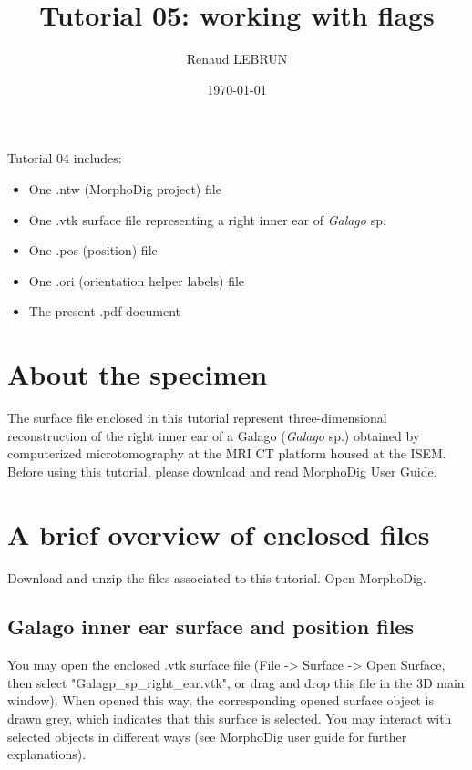 \documentclass[12pt, a4paper]{book}
\title{Tutorial 05: working with flags}
\author{Renaud LEBRUN}
\affil{Institut des Sciences de l'Evolution, Université de Montpellier, France}
\date{\today}
\begin{document}
	\dominitoc

\maketitle


\faketableofcontents



\minitoc 
Tutorial 04 includes:
\begin{itemize}
\item One .ntw (MorphoDig project) file
\item One .vtk surface file representing a right inner ear of \textit{Galago} sp.
\item One .pos (position) file 
\item One .ori (orientation helper labels) file 
\item The present .pdf document
\end{itemize}





\section{About the specimen}

The surface file enclosed in this tutorial represent three-dimensional reconstruction of the right inner ear of a Galago (\textit{Galago} sp.) obtained by computerized microtomography at the MRI \si{\micro} CT platform housed at the ISEM.\\
Before using this tutorial, please download and read MorphoDig User Guide.


\section{A brief overview of enclosed files}
		Download and unzip the files associated to this tutorial. Open MorphoDig.
\subsection{Galago inner ear surface and position files}
	You may open the enclosed .vtk surface file (File -> Surface -> Open Surface, then select "Galagp\_sp\_right\_ear.vtk", or drag and drop this file in the 3D main window). When opened
this way, the corresponding opened surface object is drawn grey, which indicates that this surface
is selected. You may interact with selected objects in different ways (see MorphoDig user guide for
further explanations).\\
\end{document}
